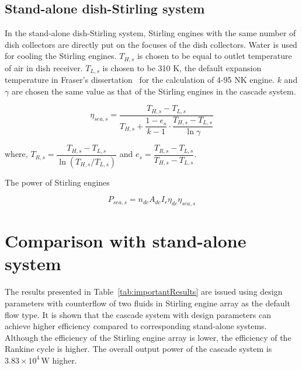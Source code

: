 \subsection{Stand-alone dish-Stirling system}

In the stand-alone dish-Stirling system, Stirling engines with the same number of dish collectors are directly put on the focuses of the dish collectors. Water is used for cooling the Stirling engines. $T_{H,s}$ is chosen to be equal to outlet temperature of air in dish receiver. $T_{L,s}$ is chosen to be 310 K, the default expansion temperature in Fraser's dissertation~\cite{Fraser2008} for the calculation of 4-95 NK\uppercase\expandafter{} engine. $k$ and $\gamma$ are chosen the same value as that of the Stirling engines in the cascade system.

\begin{equation}
	\eta_{sea,s}=\dfrac{T_{H,s}-T_{L,s}}{T_{H,s}+\dfrac{1-e_{s}}{k-1}\cdot\dfrac{T_{H,s}-T_{L,s}}{\ln\gamma}}
\end{equation}

where, $T_{R,s}=\dfrac{T_{H,s}-T_{L,s}}{\ln(T_{H,s}/T_{L,s})}$ and $e_{s}=\dfrac{T_{R,s}-T_{L,s}}{T_{H,s}-T_{L,s}}$.

The power of Stirling engines

\begin{equation}
	P_{sea,s}=n_{dc}A_{dc}I_r\eta_{dc}\eta_{sea,s}
\end{equation}

\section{Comparison with stand-alone system}
The results presented in Table~\ref{tab:importantResults} are issued using design parameters with counterflow of two fluids in Stirling engine array as the default flow type. It is shown that the cascade system with design parameters can achieve higher efficiency compared to corresponding stand-alone systems. Although the efficiency of the Stirling engine array is lower, the efficiency of the Rankine cycle is higher. The overall output power of the cascade system is $3.83\times10^4\,\mathrm{W}$ higher.

